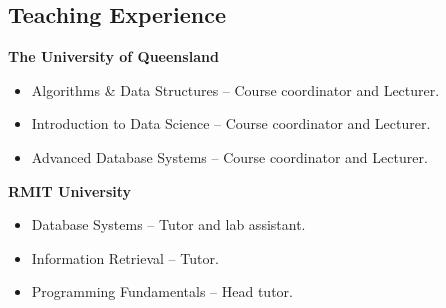 \documentclass[line]{res}
\begin{document}
\begin{resume}
\section{Teaching Experience}
                     {\bf The University of Queensland}\hfill
                      \begin{itemize}[topsep=3pt]
                        \item Algorithms \& Data Structures -- Course coordinator and Lecturer. \hfill {}
                        \item Introduction to Data Science -- Course coordinator and Lecturer. \hfill {}
                        \item Advanced Database Systems -- Course coordinator and Lecturer. \hfill {}
                      \end{itemize}
                     {\bf RMIT University}\hfill %
                      \begin{itemize}[topsep=3pt]
                        \item Database Systems -- Tutor and lab assistant. \hfill {}
                        \item Information Retrieval -- Tutor. \hfill {}
                        \item Programming Fundamentals -- Head tutor. \hfill {}

\end{itemize}
\end{resume}
\end{document}
